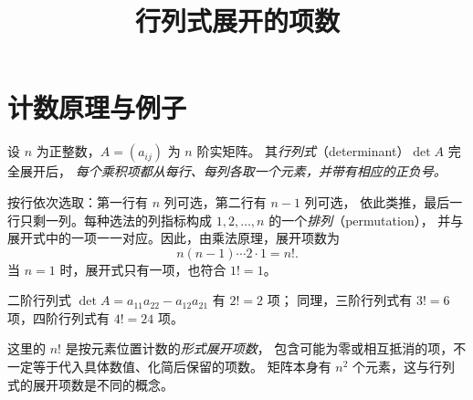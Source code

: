 \documentclass[UTF8,12pt,a4paper,fontset=fandol]{ctexart}
\title{行列式展开的项数}
\author{}
\date{}
\begin{document}
\maketitle

\section{计数原理与例子}

设 $n$ 为正整数，$A=(a_{ij})$ 为 $n$ 阶实矩阵。
其\emph{行列式}（determinant）$\det A$ 完全展开后，
\emph{每个乘积项都从每行、每列各取一个元素，并带有相应的正负号。}

按行依次选取：第一行有 $n$ 列可选，第二行有 $n-1$ 列可选，
依此类推，最后一行只剩一列。每种选法的列指标构成
$1,2,\ldots,n$ 的一个\emph{排列}（permutation），
并与展开式中的一项一一对应。因此，由乘法原理，展开项数为
\begin{equation}
  \boxed{n(n-1)\cdots 2\cdot 1=n!}.
  \label{eq:determinant-term-count}
\end{equation}
当 $n=1$ 时，展开式只有一项，也符合 $1!=1$。

\begin{example}
二阶行列式 $\det A=a_{11}a_{22}-a_{12}a_{21}$ 有 $2!=2$ 项；
同理，三阶行列式有 $3!=6$ 项，四阶行列式有 $4!=24$ 项。
\end{example}

这里的 $n!$ 是按元素位置计数的\emph{形式展开项数}，
包含可能为零或相互抵消的项，不一定等于代入具体数值、化简后保留的项数。
矩阵本身有 $n^2$ 个元素，这与行列式的展开项数是不同的概念。
\end{document}
